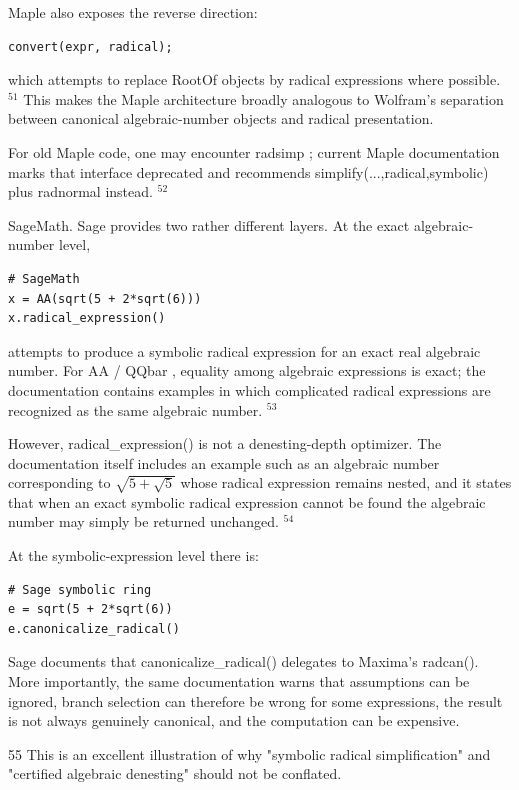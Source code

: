 \documentclass[10pt]{article}
\begin{document}
Maple also exposes the reverse direction:

\begin{verbatim}
convert(expr, radical);
\end{verbatim}

which attempts to replace RootOf objects by radical expressions where possible. ${ }^{51}$ This makes the Maple architecture broadly analogous to Wolfram's separation between canonical algebraic-number objects and radical presentation.

For old Maple code, one may encounter radsimp ; current Maple documentation marks that interface deprecated and recommends simplify(...,radical,symbolic) plus radnormal instead. ${ }^{52}$

SageMath. Sage provides two rather different layers. At the exact algebraic-number level,

\begin{verbatim}
# SageMath
x = AA(sqrt(5 + 2*sqrt(6)))
x.radical_expression()
\end{verbatim}

attempts to produce a symbolic radical expression for an exact real algebraic number. For AA / QQbar , equality among algebraic expressions is exact; the documentation contains examples in which complicated radical expressions are recognized as the same algebraic number. ${ }^{53}$

However, radical\_expression() is not a denesting-depth optimizer. The documentation itself includes an example such as an algebraic number corresponding to $\sqrt{5+\sqrt{5}}$ whose radical expression remains nested, and it states that when an exact symbolic radical expression cannot be found the algebraic number may simply be returned unchanged. ${ }^{54}$

At the symbolic-expression level there is:

\begin{verbatim}
# Sage symbolic ring
e = sqrt(5 + 2*sqrt(6))
e.canonicalize_radical()
\end{verbatim}

Sage documents that canonicalize\_radical() delegates to Maxima's radcan(). More importantly, the same documentation warns that assumptions can be ignored, branch selection can therefore be wrong for some expressions, the result is not always genuinely canonical, and the computation can be expensive.

55 This is an excellent illustration of why "symbolic radical simplification" and "certified algebraic denesting" should not be conflated.
\end{document}
